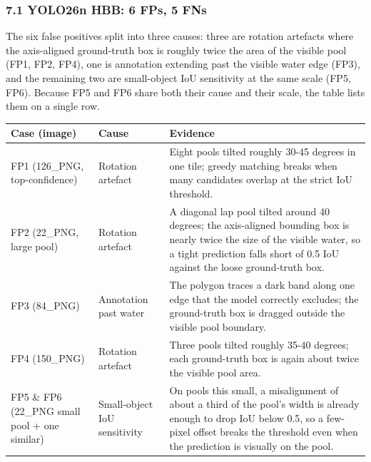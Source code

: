 \documentclass[11pt
]{article}
\newcounter{none} %
\begin{document}
\subsubsection{7.1 YOLO26n HBB: 6 FPs, 5
FNs}\label{yolo26n-hbb-failures}

The six false positives split into three causes: three are rotation
artefacts where the axis-aligned ground-truth box is roughly twice the
area of the visible pool (FP1, FP2, FP4), one is annotation extending
past the visible water edge (FP3), and the remaining two are
small-object IoU sensitivity at the same scale (FP5, FP6). Because FP5
and FP6 share both their cause and their scale, the table lists them on
a single row.

{\def\LTcaptype{none}
\begin{longtable}[]{@{}
  >{\raggedright\arraybackslash}p{}
  >{\raggedright\arraybackslash}p{}
  >{\raggedright\arraybackslash}p{}@{}}
\toprule\noalign{}
\begin{minipage}[b]{\linewidth}\raggedright
Case (image)
\end{minipage} & \begin{minipage}[b]{\linewidth}\raggedright
Cause
\end{minipage} & \begin{minipage}[b]{\linewidth}\raggedright
Evidence
\end{minipage} \\
\midrule\noalign{}
\endhead
\bottomrule\noalign{}
\endlastfoot
FP1 (126\_PNG, top-confidence) & Rotation artefact & Eight pools tilted
roughly 30-45 degrees in one tile; greedy matching breaks when many
candidates overlap at the strict IoU threshold. \\
FP2 (22\_PNG, large pool) & Rotation artefact & A diagonal lap pool
tilted around 40 degrees; the axis-aligned bounding box is nearly twice
the size of the visible water, so a tight prediction falls short of
0.5 IoU against the loose ground-truth box. \\
FP3 (84\_PNG) & Annotation past water & The polygon traces a dark band
along one edge that the model correctly excludes; the ground-truth box
is dragged outside the visible pool boundary. \\
FP4 (150\_PNG) & Rotation artefact & Three pools tilted roughly 35-40
degrees; each ground-truth box is again about twice the visible pool
area. \\
FP5 \& FP6 (22\_PNG small pool + one similar) & Small-object IoU
sensitivity & On pools this small, a misalignment of about a third of
the pool's width is already enough to drop IoU below 0.5, so a few-pixel
offset breaks the threshold even when the prediction is visually on the
pool. \\
\end{longtable}
}
\end{document}
